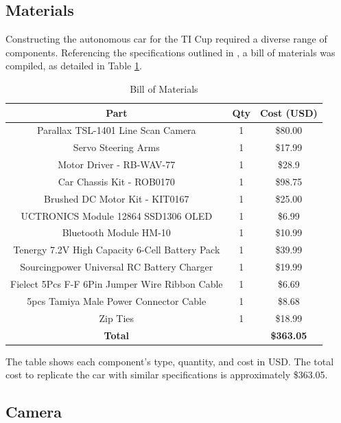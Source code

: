 \documentclass[conference]{IEEEtran}
\begin{document}
\subsection{Materials}

Constructing the autonomous car for the TI Cup required a diverse range of components. Referencing the specifications outlined in \cite{carCup2022}, a bill of materials was compiled, as detailed in Table \ref{table:billOfMaterials}.

\begin{table}[htbp]
\caption{Bill of Materials}
\begin{center}
\begin{tabular}{|c|c|c|}
\hline
Part & Qty & Cost (USD) \\
\hline
Parallax TSL-1401 Line Scan Camera & 1 & \$80.00 \\
\hline
Servo Steering Arms & 1 & \$17.99 \\
\hline
Motor Driver - RB-WAV-77 & 1 & \$28.9 \\
\hline
Car Chassis Kit - ROB0170 & 1 & \$98.75 \\
\hline
Brushed DC Motor Kit - KIT0167 & 1 & \$25.00 \\
\hline
UCTRONICS Module 12864 SSD1306 OLED & 1 & \$6.99 \\
\hline
Bluetooth Module HM-10 & 1 & \$10.99 \\
\hline
Tenergy 7.2V High Capacity 6-Cell Battery Pack & 1 & \$39.99 \\
\hline
Sourcingpower Universal RC Battery Charger & 1 & \$19.99 \\
\hline
Fielect 5Pcs F-F 6Pin Jumper Wire Ribbon Cable & 1 & \$6.69 \\
\hline
5pcs Tamiya Male Power Connector Cable & 1 & \$8.68 \\
\hline
Zip Ties & 1 & \$18.99 \\
\hline
\textbf{Total} & & \textbf{\$363.05} \\
\hline
\end{tabular}
\label{table:billOfMaterials}
\end{center}
\end{table}

The table shows each component's type, quantity, and cost in USD. The total cost to replicate the car with similar specifications is approximately \$363.05.

\subsection{Camera}
\end{document}
